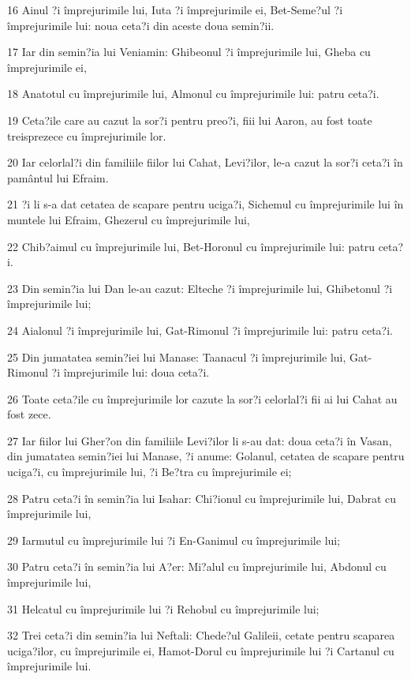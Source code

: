 \par 16 Ainul ?i împrejurimile lui, Iuta ?i împrejurimile ei, Bet-Seme?ul ?i împrejurimile lui: noua ceta?i din aceste doua semin?ii.
\par 17 Iar din semin?ia lui Veniamin: Ghibeonul ?i împrejurimile lui, Gheba cu împrejurimile ei,
\par 18 Anatotul cu împrejurimile lui, Almonul cu împrejurimile lui: patru ceta?i.
\par 19 Ceta?ile care au cazut la sor?i pentru preo?i, fiii lui Aaron, au fost toate treisprezece cu împrejurimile lor.
\par 20 Iar celorlal?i din familiile fiilor lui Cahat, Levi?ilor, le-a cazut la sor?i ceta?i în pamântul lui Efraim.
\par 21 ?i li s-a dat cetatea de scapare pentru uciga?i, Sichemul cu împrejurimile lui în muntele lui Efraim, Ghezerul cu împrejurimile lui,
\par 22 Chib?aimul cu împrejurimile lui, Bet-Horonul cu împrejurimile lui: patru ceta?i.
\par 23 Din semin?ia lui Dan le-au cazut: Elteche ?i împrejurimile lui, Ghibetonul ?i împrejurimile lui;
\par 24 Aialonul ?i împrejurimile lui, Gat-Rimonul ?i împrejurimile lui: patru ceta?i.
\par 25 Din jumatatea semin?iei lui Manase: Taanacul ?i împrejurimile lui, Gat-Rimonul ?i împrejurimile lui: doua ceta?i.
\par 26 Toate ceta?ile cu împrejurimile lor cazute la sor?i celorlal?i fii ai lui Cahat au fost zece.
\par 27 Iar fiilor lui Gher?on din familiile Levi?ilor li s-au dat: doua ceta?i în Vasan, din jumatatea semin?iei lui Manase, ?i anume: Golanul, cetatea de scapare pentru uciga?i, cu împrejurimile lui, ?i Be?tra cu împrejurimile ei;
\par 28 Patru ceta?i în semin?ia lui Isahar: Chi?ionul cu împrejurimile lui, Dabrat cu împrejurimile lui,
\par 29 Iarmutul cu împrejurimile lui ?i En-Ganimul cu împrejurimile lui;
\par 30 Patru ceta?i în semin?ia lui A?er: Mi?alul cu împrejurimile lui, Abdonul cu împrejurimile lui,
\par 31 Helcatul cu împrejurimile lui ?i Rehobul cu împrejurimile lui;
\par 32 Trei ceta?i din semin?ia lui Neftali: Chede?ul Galileii, cetate pentru scaparea uciga?ilor, cu împrejurimile ei, Hamot-Dorul cu împrejurimile lui ?i Cartanul cu împrejurimile lui.

